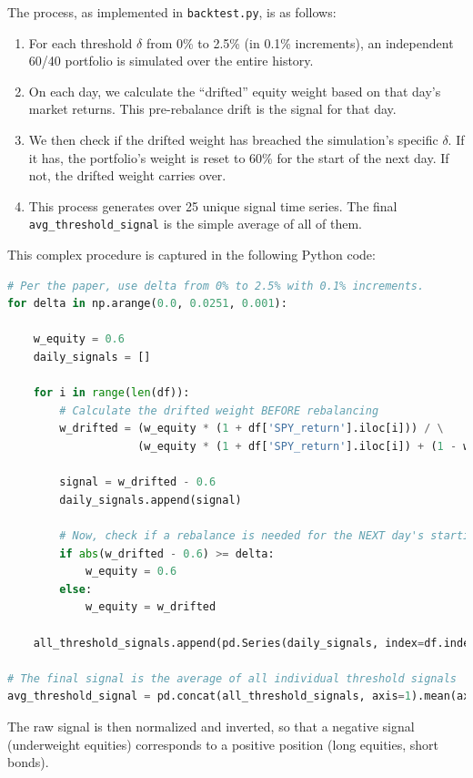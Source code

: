 \documentclass{article}
\begin{document}
The process, as implemented in \texttt{backtest.py}, is as follows:
\begin{enumerate}
    \item For each threshold $\delta$ from 0\% to 2.5\% (in 0.1\% increments), an independent 60/40 portfolio is simulated over the entire history.
    \item On each day, we calculate the ``drifted'' equity weight based on that day's market returns. This pre-rebalance drift is the signal for that day.
    \item We then check if the drifted weight has breached the simulation's specific $\delta$. If it has, the portfolio's weight is reset to 60\% for the start of the next day. If not, the drifted weight carries over.
    \item This process generates over 25 unique signal time series. The final \texttt{avg\_threshold\_signal} is the simple average of all of them.
\end{enumerate}

This complex procedure is captured in the following Python code:
\begin{lstlisting}[language=Python, caption={Threshold Signal Calculation from backtest.py}]
# Per the paper, use delta from 0% to 2.5% with 0.1% increments.
for delta in np.arange(0.0, 0.0251, 0.001):
    
    w_equity = 0.6
    daily_signals = []

    for i in range(len(df)):
        # Calculate the drifted weight BEFORE rebalancing
        w_drifted = (w_equity * (1 + df['SPY_return'].iloc[i])) / \
                    (w_equity * (1 + df['SPY_return'].iloc[i]) + (1 - w_equity) * (1 + df['TLT_return'].iloc[i]))
        
        signal = w_drifted - 0.6
        daily_signals.append(signal)
        
        # Now, check if a rebalance is needed for the NEXT day's starting weight
        if abs(w_drifted - 0.6) >= delta:
            w_equity = 0.6
        else:
            w_equity = w_drifted
    
    all_threshold_signals.append(pd.Series(daily_signals, index=df.index))

# The final signal is the average of all individual threshold signals
avg_threshold_signal = pd.concat(all_threshold_signals, axis=1).mean(axis=1)
\end{lstlisting}

The raw signal is then normalized and inverted, so that a negative signal (underweight equities) corresponds to a positive position (long equities, short bonds).
\end{document}
